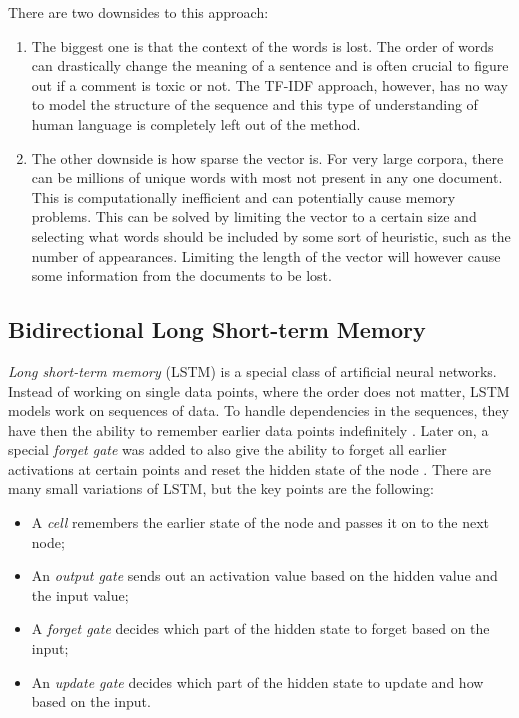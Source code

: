 \documentclass[nofilelist]{cslthse-msc}
\begin{document}
 There are two downsides to this approach: 
 \begin{enumerate}
 \item  The biggest one is that the context of the words is lost. The order of words can drastically change the meaning of a sentence and is often crucial to figure out if a comment is toxic or not. The TF-IDF approach, however, has no way to model the structure of the sequence and this type of understanding of human language is completely left out of the method.
 \item  The other downside is how sparse the vector is. For very large corpora, there can be millions of unique words with most not present in any one document. This is computationally inefficient and can potentially cause memory problems. This can be solved by limiting the vector to a certain size and selecting what words should be included by some sort of heuristic, such as the number of appearances. Limiting the length of the vector will however cause some information from the documents to be lost.
 \end{enumerate}

\subsection{Bidirectional Long Short-term Memory}

\emph{Long short-term memory} (LSTM) is a special class of artificial neural networks. Instead of working on single data points, where the order does not matter, LSTM models work on sequences of data. To handle dependencies in the sequences, they have then the ability to remember earlier data points indefinitely \citep{971021502119971115}. Later on, a special \emph{forget gate} was added to also give the ability to forget all earlier activations at certain points and reset the hidden state of the node \citep{gers1999learning}. There are many small variations of LSTM, but the key points are the following:

\begin{itemize}
    \item A \emph{cell} remembers the earlier state of the node and passes it on to the next node;
    \item An \emph{output gate} sends out an activation value based on the hidden value and the input value;
    \item A \emph{forget gate} decides which part of the hidden state to forget based on the input;
    \item An \emph{update gate} decides which part of the hidden state to update and how based on the input.
\end{itemize}
\end{document}
